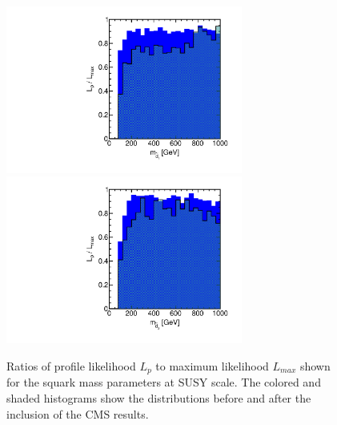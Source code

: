 \begin{figure}[htbp]
\begin{center}
\includegraphics[height=5.5cm]{figs/fig_m_d_1.pdf}
\includegraphics[height=5.5cm]{figs/fig_m_d_3.pdf}
\caption{Ratios of profile likelihood $L_p$ to maximum likelihood $L_{max}$ shown for the squark mass parameters at SUSY scale.  The colored and shaded histograms show the distributions before and after the inclusion of the CMS results.}
\label{fig:LRwcms_msq}
\end{center}
\end{figure}


